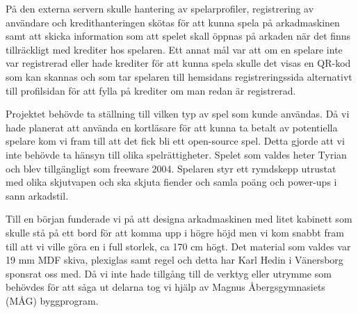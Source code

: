 \documentclass[12pt,fleqn,openany]{book} %
\begin{document}
På den externa servern skulle hantering av spelarprofiler, registrering av användare och kredithanteringen skötas för att kunna spela på arkadmaskinen
samt att skicka information som att spelet skall öppnas på arkaden när det finns tillräckligt med krediter hos spelaren. Ett annat mål 
var att om en spelare inte var registrerad eller hade krediter för att kunna spela skulle det visas en QR-kod som kan skannas och som 
tar spelaren till hemsidans registreringssida alternativt till profilsidan för att fylla på krediter om man redan är registrerad. 

Projektet behövde ta ställning till vilken typ av spel som kunde användas. Då vi hade planerat att använda en kortläsare för att kunna 
ta betalt av potentiella spelare kom vi fram till att det fick bli ett open-source spel. Detta gjorde att vi inte behövde ta hänsyn till
olika spelrättigheter. Spelet som valdes heter Tyrian och blev tillgängligt som freeware 2004. Spelaren styr ett rymdskepp utrustat med 
olika skjutvapen och ska skjuta fiender och samla poäng och power-ups i sann arkadstil.

Till en början funderade vi på att designa arkadmaskinen med litet kabinett som skulle stå på ett bord för att komma upp i högre höjd
men vi kom snabbt fram till att vi ville göra en i full storlek, ca 170 cm högt. Det material som valdes var 19 mm MDF skiva, plexiglas
samt regel och detta har Karl Hedin i Vänersborg sponsrat oss med. Då vi inte hade tillgång till de verktyg eller utrymme som behövdes 
för att såga ut delarna tog vi hjälp av Magnus Åbergsgymnasiets (MÅG) byggprogram.

\end{document}
